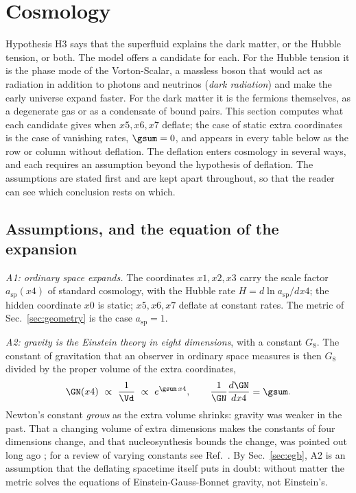 \section{Cosmology}
\label{sec:cosmo}

Hypothesis H3 says that the superfluid explains the dark matter, or the Hubble tension, or both. The
model offers a candidate for each. For the Hubble tension it is the phase mode of the Vorton-Scalar,
a massless boson that would act as radiation in addition to photons and neutrinos (\emph{dark
radiation}) and make the early universe expand faster. For the dark matter it is the fermions
themselves, as a degenerate gas or as a condensate of bound pairs. This section computes what each
candidate gives when $x5,x6,x7$ deflate; the case of static extra coordinates is the case of
vanishing rates, $\gsum=0$, and appears in every table below as the row or column without deflation.
The deflation enters cosmology in several ways, and each requires an assumption beyond the
hypothesis of deflation. The assumptions are stated first and are kept apart throughout, so that the
reader can see which conclusion rests on which.

\subsection{Assumptions, and the equation of the expansion}

\emph{A1: ordinary space expands.} The coordinates $x1,x2,x3$ carry the scale factor
$a_{\mathrm{sp}}(x4)$ of standard cosmology, with the Hubble rate $H=d\ln a_{\mathrm{sp}}/dx4$; the
hidden coordinate $x0$ is static; $x5,x6,x7$ deflate at constant rates. The metric of
Sec.~\ref{sec:geometry} is the case $a_{\mathrm{sp}}=1$.

\emph{A2: gravity is the Einstein theory in eight dimensions}, with a constant $G_8$. The constant
of gravitation that an observer in ordinary space measures is then $G_8$ divided by the proper volume
of the extra coordinates,
\begin{equation}
\GN(x4)\ \propto\ \frac{1}{\Vd}\ \propto\ e^{\gsum\,x4},\qquad\frac{1}{\GN}\frac{d\GN}{dx4}=\gsum .
\label{eq:GN}
\end{equation}
Newton's constant \emph{grows} as the extra volume shrinks: gravity was weaker in the past. That a
changing volume of extra dimensions makes the constants of four dimensions change, and that
nucleosynthesis bounds the change, was pointed out long ago \cite{KolbPerryWalker1986}; for a review
of varying constants see Ref.~\cite{Uzan2011}. By Sec.~\ref{sec:egb}, A2 is an assumption that the
deflating spacetime itself puts in doubt: without matter the metric solves the equations of
Einstein-Gauss-Bonnet gravity, not Einstein's.

